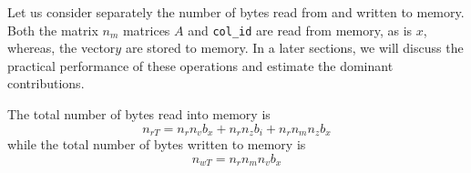 \documentclass[10pt, conference, compsocconf]{IEEEtran}
\def\blue#1{\textbf{\textcolor{blue}{#1}}}
\def\qes#1{{\blue{*** For Erik: #1 ***}}}
\def\ttt#1{{\tt #1}}
\def\qes#1{}
\begin{document}
Let us consider separately the number of bytes read from and written to memory.
Both the matrix $n_m$ matrices $A$ \qes{need an index on $A$ since there are more than one?} and \ttt{col\_id} are read from memory, as is $x$, whereas, the vector$y$ are stored to memory. In a later sections, we will discuss the practical performance of these operations and estimate the dominant contributions. 
\qes{We also wish to isolate the effects of read, write and compute operations as a function of the number of cores and threads to see how they influence the results and to estimate whether our results have the potential to scale similarly on systems with a higher number of cores. We "might" also compare are results against the best implementation using OpenCL, or do so in the paper.}

The total number of bytes read into memory is
$$ 
n_{rT} = n_r n_v b_x + n_r n_z b_i + n_r n_m n_z b_x
$$
while the total number of bytes written to memory is
$$
n_{wT} = n_r n_m n_v b_x
$$
\end{document}
